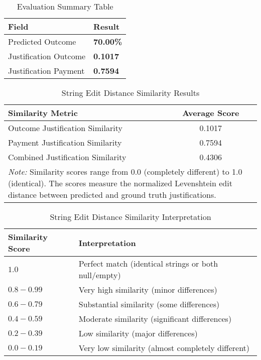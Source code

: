 
\begin{table}[H]
\centering
\caption{Evaluation Summary Table}
\label{tab:evaluation_summary}
\begin{tabular}{@{}lp{2cm}@{}}
\toprule
\textbf{Field} & \textbf{Result} \\
\midrule
Predicted Outcome & \textbf{70.00\%} \\
Justification Outcome &  \textbf{0.1017} \\
Justification Payment &  \textbf{0.7594} \\
\bottomrule
\end{tabular}
\end{table}

\begin{table}[!ht]
\centering
\caption{String Edit Distance Similarity Results}
\label{tab:string_edit_distance_results}
\begin{tabular}{lc}
\toprule
\textbf{Similarity Metric} & \textbf{Average Score} \\
\midrule
Outcome Justification Similarity & 0.1017 \\
Payment Justification Similarity & 0.7594 \\
Combined Justification Similarity & 0.4306 \\
\midrule
\multicolumn{2}{p{13cm}}{\textit{Note:} Similarity scores range from 0.0 (completely different) to 1.0 (identical). 
The scores measure the normalized Levenshtein edit distance between predicted and ground truth justifications.} \\
\bottomrule
\end{tabular}
\end{table}

\begin{table}[!ht]
\centering
\caption{String Edit Distance Similarity Interpretation}
\label{tab:string_edit_distance_interpretation}
\begin{tabular}{p{3cm}p{10cm}}
\toprule
\textbf{Similarity Score} & \textbf{Interpretation} \\
\midrule
$1.0$ & Perfect match (identical strings or both null/empty) \\
$0.8 - 0.99$ & Very high similarity (minor differences) \\
$0.6 - 0.79$ & Substantial similarity (some differences) \\
$0.4 - 0.59$ & Moderate similarity (significant differences) \\
$0.2 - 0.39$ & Low similarity (major differences) \\
$0.0 - 0.19$ & Very low similarity (almost completely different) \\
\bottomrule
\end{tabular}
\end{table}

